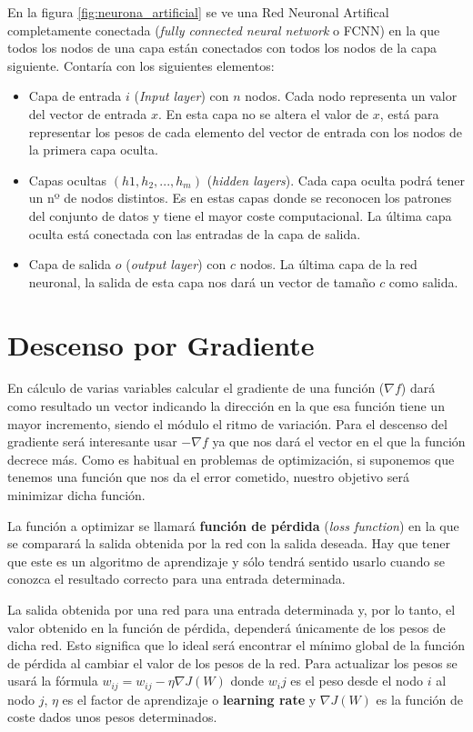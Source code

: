 En la figura \ref{fig:neurona_artificial} se ve una Red Neuronal Artifical completamente conectada (\textit{fully connected neural network} o FCNN) en la que todos los nodos de una capa están conectados con todos los nodos de la capa siguiente. Contaría con los siguientes elementos:
\begin{itemize}
\item Capa de entrada $i$ (\textit{Input layer}) con $ n $ nodos. Cada nodo representa un valor del vector de entrada $ x $. En esta capa no se altera el valor de $x$, está para representar los pesos de cada elemento del vector de entrada con los nodos de la primera capa oculta.
\item Capas ocultas $(h1, h_2, ..., h_m)$ (\textit{hidden layers}). Cada capa oculta podrá tener un nº de nodos distintos. Es en estas capas donde se reconocen los patrones del conjunto de datos y tiene el mayor coste computacional. La última capa oculta está conectada con las entradas de la capa de salida.
\item Capa de salida $o$ (\textit{output layer}) con $c$ nodos. La última capa de la red neuronal, la salida de esta capa nos dará un vector de tamaño $c$ como salida.
\end{itemize}

\section{Descenso por Gradiente }\label{sec:gradient_descent}

En cálculo de varias variables calcular el gradiente de una función ($\nabla f$) dará como resultado un vector indicando la dirección en la que esa función tiene un mayor incremento, siendo el módulo el ritmo de variación. Para el descenso del gradiente será interesante usar $-\nabla f$ ya que nos dará el vector en el que la función decrece más. Como es habitual en problemas de optimización, si suponemos que tenemos una función que nos da el error cometido, nuestro objetivo será minimizar dicha función.

La función a optimizar se llamará \textbf{función de pérdida} (\textit{loss function}) en la que se comparará la salida obtenida por la red con la salida deseada. Hay que tener que este es un algoritmo de aprendizaje y sólo tendrá sentido usarlo cuando se conozca el resultado correcto para una entrada determinada.

La salida obtenida por una red para una entrada determinada y, por lo tanto, el valor obtenido en la función de pérdida, dependerá únicamente de los pesos de dicha red. Esto significa que lo ideal será encontrar el mínimo global de la función de pérdida al cambiar el valor de los pesos de la red. Para actualizar los pesos se usará la fórmula $w_{ij} = w_{ij} - \eta \nabla J(W)$ donde $w_ij$ es el peso desde el nodo $i$ al nodo $j$, $\eta$ es el factor de aprendizaje o \textbf{learning rate} y $\nabla J(W)$ es la función de coste dados unos pesos determinados.

